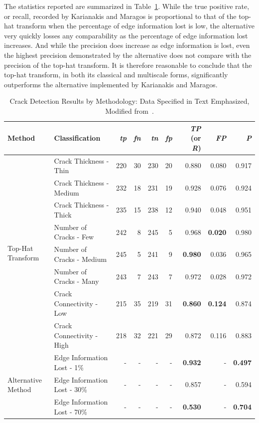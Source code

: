 \documentclass{sig-alternate}
\begin{document}
The statistics reported are summarized in Table~\ref{results table}. While the true positive rate, or recall, recorded by Karianakis and Maragos is proportional to that of the top-hat transform when the percentage of edge information lost is low, the alternative very quickly losses any comparability as the percentage of edge information lost increases. And while the precision does increase as edge information is lost, even the highest precision demonstrated by the alternative does not compare with the precision of the top-hat transform. It is therefore reasonable to conclude that the top-hat transform, in both its classical and multiscale forms, significantly outperforms the alternative implemented by Karianakis and Maragos.
\begin{table}
\centering
\begin{tabular}{|l|l|r|r|r|r|r|r|r|}
\hline
\textbf{Method} & \textbf{Classification} & \textbf{\textit{tp}} & \textbf{\textit{fn}} & \textbf{\textit{tn}} & \textbf{\textit{fp}} & \textbf{\textit{TP} (or \textit{R})} & \textbf{\textit{FP}} & \textbf{\textit{P}}\\ \hline
\multirow{8}{*}{Top-Hat Transform}
& Crack Thickness - Thin & 220 & 30 & 230 & 20 & 0.880 & 0.080 & 0.917\\ \cline{2-9}
& Crack Thickness - Medium & 232 & 18 & 231 & 19 & 0.928 & 0.076 & 0.924\\ \cline{2-9}
& Crack Thickness - Thick & 235 & 15 & 238 & 12 & 0.940 & 0.048 & 0.951\\ \cline{2-9}
& Number of Cracks - Few & 242 & 8 & 245 & 5 & 0.968 & \textbf{0.020} & 0.980\\ \cline{2-9}
& Number of Cracks - Medium & 245 & 5 & 241 & 9 & \textbf{0.980} & 0.036 & 0.965\\ \cline{2-9}
& Number of Cracks - Many & 243 & 7 & 243 & 7 & 0.972 & 0.028 & 0.972\\ \cline{2-9}
& Crack Connectivity - Low & 215 & 35 & 219 & 31 & \textbf{0.860} & \textbf{0.124} & 0.874\\ \cline{2-9}
& Crack Connectivity - High & 218 & 32 & 221 & 29 & 0.872 & 0.116 & 0.883\\ \hline
\multirow{3}{*}{Alternative Method}
& Edge Information Lost - 1\% & - & - & - & - & \textbf{0.932} & - & \textbf{0.497}\\ \cline{2-9}
& Edge Information Lost - 30\% & - & - & - & - & 0.857 & - & 0.594\\ \cline{2-9}
& Edge Information Lost - 70\% & - & - & - & - & \textbf{0.530} & - & \textbf{0.704}\\ \hline
\end{tabular}
\caption{Crack Detection Results by Methodology: Data Specified in Text Emphasized, Modified from~\cite{Statistics:2013, Theran:2013}.}
\label{results table}
\end{table}
\end{document}
